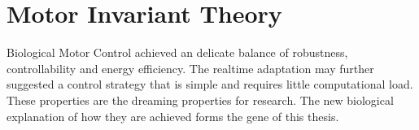 %

\section{Motor Invariant Theory}
Biological Motor Control achieved an delicate balance of robustness, controllability and energy efficiency.
The realtime adaptation may further suggested a control strategy that is simple and requires little computational load.
These properties are the dreaming properties for \cms research.
The new biological explanation of how they are achieved forms the gene of this thesis.


